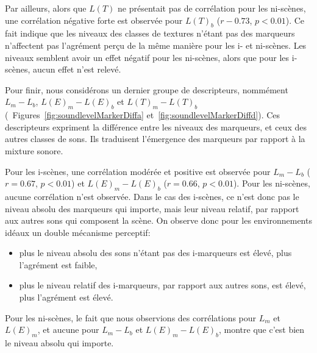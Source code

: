 \documentclass[twoside,twocolumn]{article}
\begin{document}
Par ailleurs, alors que $L(T)$ ne présentait pas de corrélation pour les ni-scènes, une corrélation négative forte est observée pour $L(T)_b$ ($r-0.73$, $p<0.01$). Ce fait indique que les niveaux des classes de textures n'étant pas des marqueurs n'affectent pas l'agrément perçu de la même manière pour les i- et ni-scènes. Les niveaux semblent avoir un effet négatif pour les ni-scènes, alors que pour les i-scènes, aucun effet n'est relevé.

Pour finir, nous considérons un dernier groupe de descripteurs, nommément $L_m-L_b$, $L(E)_m-L(E)_b$ et $L(T)_m-L(T)_b$ (\cf~Figures~\ref{fig:soundlevelMarkerDiffa} et~\ref{fig:soundlevelMarkerDiffd}). Ces descripteurs expriment la différence entre les niveaux des marqueurs, et ceux des autres classes de sons. Ils traduisent l'émergence des marqueurs par rapport à la mixture sonore.

Pour les i-scènes, une corrélation modérée et positive est observée pour $L_m-L_b$ ($r=0.67$, $p<0.01$) et $L(E)_m-L(E)_b$ ($r=0.66$, $p<0.01$). Pour les ni-scènes, aucune corrélation n'est observée. Dans le cas des i-scènes, ce n'est donc pas le niveau absolu des marqueurs qui importe, mais leur niveau relatif, par rapport aux autres sons qui composent la scène. On observe donc pour les environnements idéaux un double mécanisme perceptif: 

\begin{itemize}
\item plus le niveau absolu des sons n'étant pas des i-marqueurs est élevé, plus l'agrément est faible,
\item plus le niveau relatif des i-marqueurs, par rapport aux autres sons, est élevé, plus l'agrément est élevé.
\end{itemize}

Pour les ni-scènes, le fait que nous observions des corrélations pour $L_m$ et $L(E)_m$, et aucune pour $L_m-L_b$ et $L(E)_m-L(E)_b$, montre que c'est bien le niveau absolu qui importe.
\end{document}
